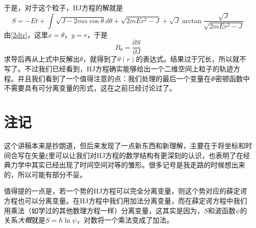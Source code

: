 \documentclass{ctexart}
\begin{document}
于是，对于这个粒子，HJ方程的解就是
\begin{equation}
S = -Et + \int \sqrt{J - 2m\alpha \cos \theta} d\theta +\sqrt{2mE r^2-J}+\sqrt{J} \arctan\frac{\sqrt{J}}{\sqrt{2mE r^2-J}}
\end{equation}
由\cref{2dtr}，这里$x = \theta$，$y = r$，于是
\begin{equation}
B_\theta = \frac{\partial S}{\partial J}
\end{equation}
求导后再从上式中反解出$\theta$，就得到了$\theta (r)$的表达式。结果过于冗长，所以就不写了。不过我们已经看到，HJ方程确实能够给出一个二维空间上粒子的轨迹方程。并且我们看到了一个值得注意的点：我们处理的最后一个变量在$\Phi$密顿函数中不需要具有可分离变量的形式，这在之前已经讨论过了。

\section{注记}
这个讲稿本来是抄朗道，但后来发现了一点新东西和新理解，主要在于将坐标和时间合写在矢量$\xi$里可以让我们对HJ方程的数学结构有更深刻的认识，也表明了在经典力学中其实已经出现了时间空间对等的雏形。很多记号是我走路的时候想出来的，所以可能有部分不妥。\par
值得提的一点是，若一个势的HJ方程可以完全分离变量，则这个势对应的薛定谔方程也可以分离变量。在HJ方程中我们用加法分离变量，而在薛定谔方程中我们用乘法（如学过的其他数理方程一样）分离变量，这其实是因为，$S$和波函数$\psi$的关系\emph{大概}就是$S = \hbar \ln \psi$，对数将一个乘法变成了加法。
\end{document}
